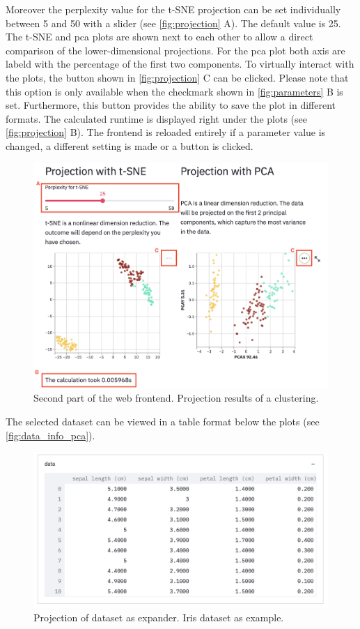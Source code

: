 Moreover the perplexity value for the t-SNE projection can be set individually between 5 and 50 with a slider (see \autoref{fig:projection} A). The default value is 25. The \acrshort{t-SNE} and \acrshort{pca} plots are shown next to each other to allow a direct comparison of the lower-dimensional projections. For the \acrshort{pca} plot both axis are labeld with the percentage of the first two components. To virtually interact with the plots, the button shown in \autoref{fig:projection} C can be clicked. Please note that this option is only available when the checkmark shown in \autoref{fig:parameters} B is set. Furthermore, this button provides the ability to save the plot in different formats.
The calculated runtime is displayed right under the plots (see \autoref{fig:projection} B).
The frontend is reloaded entirely if a parameter value is changed, a different setting is made or a button is clicked. 
\begin{figure}[H]
	\centering
	\includegraphics[width=\linewidth]{modules/web_frontend/projection_letters}
	\caption{Second part of the web frontend. Projection results of a clustering.}\label{fig:projection}
\end{figure}

The selected dataset can be viewed in a table format below the plots (see \autoref{fig:data_info_pca}).

\begin{figure}[H]
	\centering
	\includegraphics[width=\linewidth]{report/modules/web_frontend/data_info_pca.png}
	\caption{Projection of dataset as expander. Iris dataset as example.}\label{fig:data_info_pca}
\end{figure}

